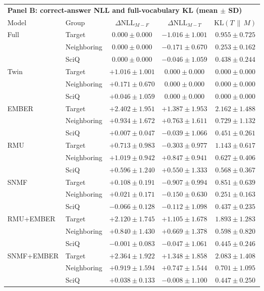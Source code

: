 \begin{table}[h]
  \vspace{1em}
  \begin{tabular}{llccc}
    \toprule
    \multicolumn{5}{l}{\textbf{Panel B: correct-answer NLL and full-vocabulary KL (mean $\pm$ SD)}} \\
    \cmidrule(lr){1-5}
    Model & Group & $\Delta\mathrm{NLL}_{M-F}$ & $\Delta\mathrm{NLL}_{M-T}$ & $\mathrm{KL}(T\,\|\,M)$ \\
    \midrule
    Full  & Target      & $0.000 \pm 0.000$ & $-1.016 \pm 1.001$ & $0.955 \pm 0.725$ \\
          & Neighboring & $0.000 \pm 0.000$ & $-0.171 \pm 0.670$ & $0.253 \pm 0.162$ \\
          & SciQ        & $0.000 \pm 0.000$ & $-0.046 \pm 1.059$ & $0.438 \pm 0.244$ \\
    Twin  & Target      & $+1.016 \pm 1.001$ & $0.000 \pm 0.000$ & $0.000 \pm 0.000$ \\
          & Neighboring & $+0.171 \pm 0.670$ & $0.000 \pm 0.000$ & $0.000 \pm 0.000$ \\
          & SciQ        & $+0.046 \pm 1.059$ & $0.000 \pm 0.000$ & $0.000 \pm 0.000$ \\
    EMBER & Target      & $\mathbf{+2.402 \pm 1.951}$ & $+1.387 \pm 1.953$ & $2.162 \pm 1.488$ \\
          & Neighboring & $+0.934 \pm 1.672$ & $+0.763 \pm 1.611$ & $0.729 \pm 1.132$ \\
          & SciQ        & $+0.007 \pm 0.047$ & $-0.039 \pm 1.066$ & $0.451 \pm 0.261$ \\
    RMU   & Target      & $+0.713 \pm 0.983$ & $\mathbf{-0.303 \pm 0.977}$ & $1.143 \pm 0.617$ \\
          & Neighboring & $+1.019 \pm 0.942$ & $+0.847 \pm 0.941$ & $0.627 \pm 0.406$ \\
          & SciQ        & $+0.596 \pm 1.240$ & $+0.550 \pm 1.333$ & $0.568 \pm 0.367$ \\
    SNMF  & Target      & $+0.108 \pm 0.191$ & $-0.907 \pm 0.994$ & $\mathbf{0.851 \pm 0.639}$ \\
          & Neighboring & $\mathbf{+0.021 \pm 0.171}$ & $\mathbf{-0.150 \pm 0.630}$ & $\mathbf{0.251 \pm 0.163}$ \\
          & SciQ        & $-0.066 \pm 0.128$ & $-0.112 \pm 1.098$ & $\mathbf{0.437 \pm 0.235}$ \\
    RMU+EMBER & Target      & $+2.120 \pm 1.745$ & $+1.105 \pm 1.678$ & $1.893 \pm 1.283$ \\
          & Neighboring & $+0.840 \pm 1.430$ & $+0.669 \pm 1.378$ & $0.598 \pm 0.820$ \\
          & SciQ        & $\mathbf{-0.001 \pm 0.083}$ & $-0.047 \pm 1.061$ & $0.445 \pm 0.246$ \\
    SNMF+EMBER & Target      & $+2.364 \pm 1.922$ & $+1.348 \pm 1.858$ & $2.083 \pm 1.408$ \\
          & Neighboring & $+0.919 \pm 1.594$ & $+0.747 \pm 1.544$ & $0.701 \pm 1.095$ \\
          & SciQ        & $+0.038 \pm 0.133$ & $\mathbf{-0.008 \pm 1.100}$ & $0.447 \pm 0.250$ \\
    \bottomrule
  \end{tabular}


\end{table}
